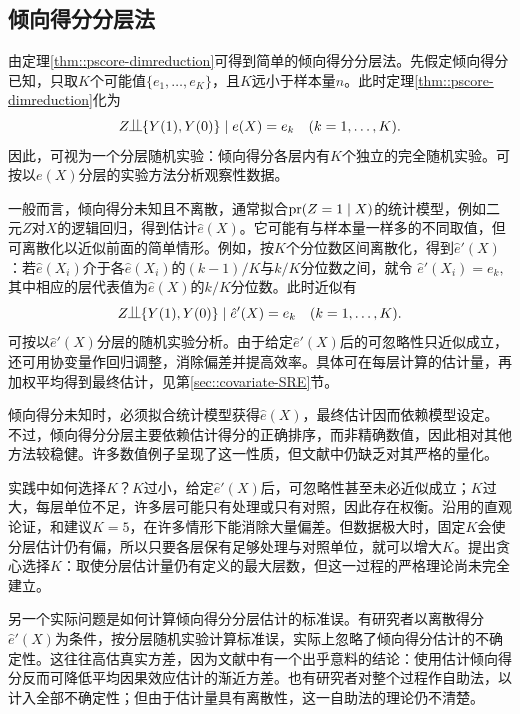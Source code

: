 \subsection{倾向得分分层法}
\label{sec::pscore-stratification}




由定理\ref{thm::pscore-dimreduction}可得到简单的倾向得分分层法。先假定倾向得分已知，只取$K$个可能值$\{ e_1,\ldots, e_K \}$，且$K$远小于样本量$n$。此时定理\ref{thm::pscore-dimreduction}化为
$$
Z\ind \{ Y(1), Y(0)  \} \mid e(X) = e_k  \quad (k=1,\ldots, K).
$$
因此，可视为一个分层随机实验：倾向得分各层内有$K$个独立的完全随机实验。可按以$e(X)$分层的实验方法分析观察性数据。 


一般而言，倾向得分未知且不离散，通常拟合$\textup{pr}(Z = 1\mid X)$的统计模型，例如二元$Z$对$X$的逻辑回归，得到估计$\hat{e}(X)$。它可能有与样本量一样多的不同取值，但可离散化以近似前面的简单情形。例如，按$K$个分位数区间离散化，得到$\hat{e}'(X)$：若$ \hat{e}(X_i)$介于各$\hat{e}(X_i)$的$(k-1)/K$与$k/K$分位数之间，就令
$
\hat{e}'(X_i) = e_k,
$
其中相应的层代表值为$\hat{e}(X)$的$k/K$分位数。此时近似有
$$
Z\ind \{ Y(1), Y(0)  \} \mid \hat{e}'(X) = e_k  \quad (k=1,\ldots, K).
$$
可按以$\hat{e}'(X)$分层的随机实验分析。由于给定$\hat{e}'(X)$后的可忽略性只近似成立，还可用协变量作回归调整，消除偏差并提高效率。具体可在每层计算\citet{lin2013}的估计量，再加权平均得到最终估计，见第\ref{sec::covariate-SRE}节。 


 




倾向得分未知时，必须拟合统计模型获得$\hat{e}(X)$，最终估计因而依赖模型设定。不过，倾向得分分层主要依赖估计得分的正确排序，而非精确数值，因此相对其他方法较稳健。许多数值例子呈现了这一性质，但文献中仍缺乏对其严格的量化。 




实践中如何选择$K$？$K$过小，给定$\hat{e}'(X)$后，可忽略性甚至未必近似成立；$K$过大，每层单位不足，许多层可能只有处理或只有对照，因此存在权衡。沿用\citet{cochran1968effectiveness}的直观论证，\citet{rosenbaum1983central}和\citet{rosenbaum1984reducing}建议$K=5$，在许多情形下能消除大量偏差。但数据极大时，固定$K$会使分层估计仍有偏\citep{lunceford2004stratification}，所以只要各层保有足够处理与对照单位，就可以增大$K$。\citet{wang2020robust}提出贪心选择$K$：取使分层估计量仍有定义的最大层数，但这一过程的严格理论尚未完全建立。 




另一个实际问题是如何计算倾向得分分层估计的标准误。有研究者以离散得分$\hat{e}'(X)$为条件，按分层随机实验计算标准误，实际上忽略了倾向得分估计的不确定性。这往往高估真实方差，因为文献中有一个出乎意料的结论：使用估计倾向得分反而可降低平均因果效应估计的渐近方差\citep{su2023estimated}。也有研究者对整个过程作自助法，以计入全部不确定性；但由于估计量具有离散性，这一自助法的理论仍不清楚。 
 
